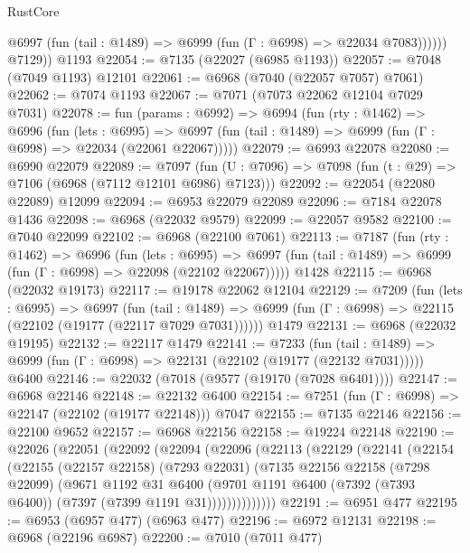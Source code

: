 \begin{lexlean}{RustCore}
\begin{coremodule}
              @6997 (fun (tail : @1489) => @6999 (fun (Γ : @6998) => @22034 @7083))))))
        @7129))
    @1193
@22054 := @7135 (@22027 (@6985 @1193))
@22057 := @7048 (@7049 @1193) @12101
@22061 := @6968 (@7040 (@22057 @7057) @7061)
@22062 := @7074 @1193
@22067 := @7071 (@7073 @22062 @12104 @7029 @7031)
@22078 := fun (params : @6992) =>
  @6994
    (fun (rty : @1462) =>
    @6996
      (fun (lets : @6995) =>
      @6997 (fun (tail : @1489) => @6999 (fun (Γ : @6998) => @22034 (@22061 @22067)))))
@22079 := @6993 @22078
@22080 := @6990 @22079
@22089 := @7097
    (fun (U : @7096) => @7098 (fun (t : @29) => @7106 (@6968 (@7112 @12101 @6986) @7123)))
@22092 := @22054 (@22080 @22089) @12099
@22094 := @6953 @22079 @22089
@22096 := @7184 @22078 @1436
@22098 := @6968 (@22032 @9579)
@22099 := @22057 @9582
@22100 := @7040 @22099
@22102 := @6968 (@22100 @7061)
@22113 := @7187
    (fun (rty : @1462) =>
    @6996
      (fun (lets : @6995) =>
      @6997 (fun (tail : @1489) => @6999 (fun (Γ : @6998) => @22098 (@22102 @22067)))))
    @1428
@22115 := @6968 (@22032 @19173)
@22117 := @19178 @22062 @12104
@22129 := @7209
    (fun (lets : @6995) =>
    @6997
      (fun (tail : @1489) =>
      @6999 (fun (Γ : @6998) => @22115 (@22102 (@19177 (@22117 @7029 @7031))))))
    @1479
@22131 := @6968 (@22032 @19195)
@22132 := @22117 @1479
@22141 := @7233
    (fun (tail : @1489) => @6999 (fun (Γ : @6998) => @22131 (@22102 (@19177 (@22132 @7031)))))
    @6400
@22146 := @22032 (@7018 (@9577 (@19170 (@7028 @6401))))
@22147 := @6968 @22146
@22148 := @22132 @6400
@22154 := @7251 (fun (Γ : @6998) => @22147 (@22102 (@19177 @22148))) @7047
@22155 := @7135 @22146
@22156 := @22100 @9652
@22157 := @6968 @22156
@22158 := @19224 @22148
@22190 := @22026
    (@22051
      (@22092
        (@22094
          (@22096
            (@22113
              (@22129
                (@22141
                  (@22154
                    (@22155
                      (@22157 @22158)
                      (@7293 @22031)
                      (@7135
                        @22156
                        @22158
                        (@7298 @22099)
                        (@9671
                          @1192
                          @31
                          @6400
                          (@9701
                            @1191
                            @6400
                            (@7392 (@7393 @6400))
                            (@7397 (@7399 @1191 @31))))))))))))))
@22191 := @6951 @477
@22195 := @6953 (@6957 @477) (@6963 @477)
@22196 := @6972 @12131
@22198 := @6968 (@22196 @6987)
@22200 := @7010 (@7011 @477)

\end{coremodule}
\end{lexlean}
